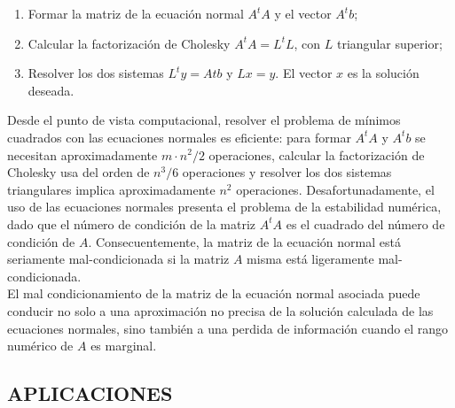 \documentclass[twocolumn,twoside]{article}
\begin{document}
\begin{enumerate}[label=(\roman*)]

      \item Formar la matriz de la ecuaci\'on normal $A^t A$ y el vector $A^t b$;
      \item Calcular la factorizaci\'on de Cholesky $A^t A = L^t L$, con $L$ triangular superior;
      \item Resolver los dos sistemas $L^t y = A t b$ y $L x = y$. El vector $x$ es la soluci\'on deseada.
  

\end{enumerate}
Desde el punto de vista computacional, resolver el problema de m\'inimos cuadrados
con las ecuaciones normales es eficiente: para formar $A^t A$ y $A^t b$ se necesitan aproximadamente
$ m\cdot n^2/2$ operaciones, calcular la factorizaci\'on de Cholesky usa del orden de $n^3 /6$
operaciones y resolver los dos sistemas triangulares implica aproximadamente $n^2$ operaciones.
Desafortunadamente, el uso de las ecuaciones normales presenta el problema de la
estabilidad num\'erica, dado que el n\'umero de condici\'on de la matriz $A^t A$ es el cuadrado
del n\'umero de condici\'on de $A$. Consecuentemente, la matriz de la ecuaci\'on normal est\'a
seriamente mal-condicionada si la matriz $A$ misma est\'a ligeramente mal-condicionada.\\
El mal condicionamiento de la matriz de la ecuaci\'on normal asociada puede conducir
no solo a una aproximaci\'on no precisa de la soluci\'on calculada de las ecuaciones normales,
sino tambi\'en a una perdida de informaci\'on cuando el rango num\'erico de $A$ es marginal.
\subsection{APLICACIONES}
\end{document}
